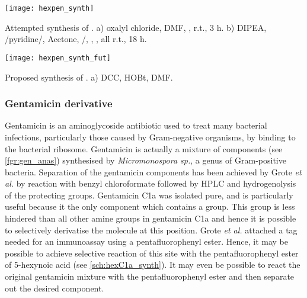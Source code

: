 \begin{scheme}[H]
	\begin{center}
		\texttt{[image: hexpen\_synth]}
		\caption{Attempted synthesis of . a) oxalyl chloride, DMF, , r.t., 3 h. 
		b) DIPEA, /pyridine/, Acetone, /, , , all r.t., 18 h. 
		\label{sch:hexpen_synth}}
	\end{center}
\end{scheme}



\begin{scheme}[H]
	\begin{center}
		\texttt{[image: hexpen\_synth\_fut]}
		\caption{Proposed synthesis of . a) DCC, HOBt, DMF. \label{sch:hexpen_synth_fut}}
	\end{center}
\end{scheme}

\subsubsection{Gentamicin derivative }

Gentamicin is an aminoglycoside antibiotic used to treat many bacterial infections, particularly those caused by Gram-negative organisms, by binding to the bacterial ribosome. Gentamicin is actually a mixture of components (see \ref{fgr:gen_anas}) synthesised by \textit{Micromonospora sp.}, a genus of Gram-positive bacteria. Separation of the gentamicin components has been achieved by Grote \textit{et al.} \cite{Grote2012} by reaction with benzyl chloroformate followed by HPLC and hydrogenolysis of the protecting groups. 
Gentamicin C1a  was isolated pure, and is particularly useful because it the only component which contains a  group. This group is less hindered than all other amine groups in gentamicin C1a  and hence it is possible to selectively derivatise the molecule at this position. Grote \textit{et al.} attached a tag needed for an immunoassay using a pentafluorophenyl ester\cite{Cheshev2010}. Hence, it may be possible to achieve selective reaction of this site with the pentafluorophenyl ester of 5-hexynoic acid  (see \ref{sch:hexC1a_synth}). It may even be possible to react the original gentamicin mixture with the pentafluorophenyl ester and then separate out the desired component.

